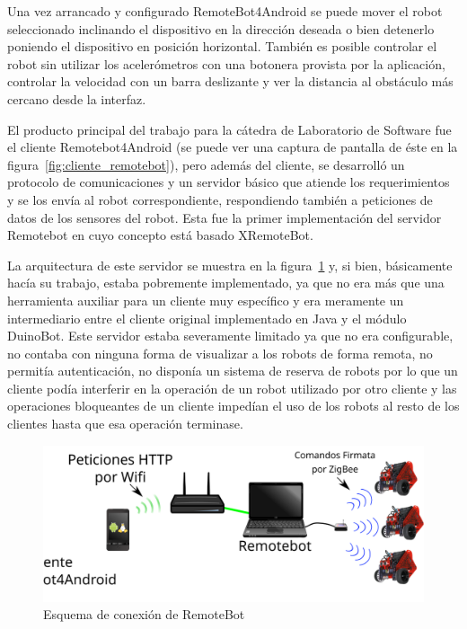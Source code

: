 Una vez arrancado y configurado RemoteBot4Android se puede mover el robot
seleccionado inclinando el dispositivo en la dirección deseada o bien
detenerlo poniendo el dispositivo en posición horizontal. También es
posible controlar el robot sin utilizar los acelerómetros
con una botonera provista por la aplicación,
controlar la velocidad con un barra deslizante y ver la distancia al obstáculo
más cercano desde la interfaz.

El producto principal del trabajo para la cátedra de Laboratorio de
Software fue el cliente
Remotebot4Android (se puede ver una captura de pantalla de éste
en la figura~\ref{fig:cliente_remotebot}),
pero además del cliente, se desarrolló un
protocolo de comunicaciones
y un servidor básico que atiende los requerimientos y se los envía al
robot correspondiente, respondiendo también a peticiones de datos de
los sensores del
robot. Esta fue la primer implementación del servidor
Remotebot
en cuyo concepto está basado XRemoteBot.

La arquitectura de este servidor se muestra en la
figura~\ref{fig:arquitectura_remotebot} y, si bien, básicamente hacía
su trabajo,
estaba pobremente implementado, ya que no era más que una herramienta auxiliar
para un cliente muy específico y era meramente un intermediario entre el
cliente original implementado en Java y el módulo DuinoBot. Este servidor
estaba severamente limitado
ya que no era configurable, no contaba con ninguna forma de visualizar a los
robots de forma remota, no permitía autenticación, no disponía un sistema
de reserva de robots por lo que un cliente podía interferir en la operación
de un robot utilizado por otro cliente y las operaciones bloqueantes de un
cliente
impedían el uso de los robots al resto de los clientes hasta que esa operación
terminase.

\begin{figure}
    \centering
    \includegraphics[width=\textwidth]{figures/arquitectura_remotebot}
    \caption{Esquema de conexión de RemoteBot}\label{fig:arquitectura_remotebot}
\end{figure}



